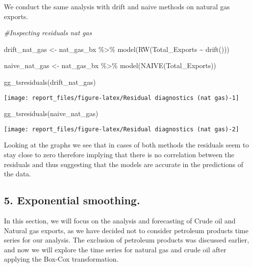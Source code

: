 \documentclass[
]{article}
\newenvironment{Shaded}{\begin{snugshade}}{\end{snugshade}}
\newcommand{\CommentTok}[1]{\textcolor[rgb]{0.56,0.35,0.01}{\textit{#1}}}
\newcommand{\FunctionTok}[1]{\textcolor[rgb]{0.00,0.00,0.00}{#1}}
\newcommand{\NormalTok}[1]{#1}
\newcommand{\OtherTok}[1]{\textcolor[rgb]{0.56,0.35,0.01}{#1}}
\newcommand{\SpecialCharTok}[1]{\textcolor[rgb]{0.00,0.00,0.00}{#1}}
\begin{document}
We conduct the same analysis with drift and naive methods on natural gas
exports.

\begin{Shaded}
\begin{Highlighting}[]
\CommentTok{\#Inspecting residuals nat gas}

\NormalTok{drift\_nat\_gas }\OtherTok{\textless{}{-}}\NormalTok{ nat\_gas\_bx }\SpecialCharTok{\%\textgreater{}\%} 
  \FunctionTok{model}\NormalTok{(}\FunctionTok{RW}\NormalTok{(Total\_Exports }\SpecialCharTok{\textasciitilde{}} \FunctionTok{drift}\NormalTok{()))}

\NormalTok{naive\_nat\_gas }\OtherTok{\textless{}{-}}\NormalTok{ nat\_gas\_bx }\SpecialCharTok{\%\textgreater{}\%} 
  \FunctionTok{model}\NormalTok{(}\FunctionTok{NAIVE}\NormalTok{(Total\_Exports))}

\FunctionTok{gg\_tsresiduals}\NormalTok{(drift\_nat\_gas)}
\end{Highlighting}
\end{Shaded}

\begin{center}\texttt{[image: report\_files/figure-latex/Residual diagnostics (nat gas)-1]} \end{center}

\begin{Shaded}
\begin{Highlighting}[]
\FunctionTok{gg\_tsresiduals}\NormalTok{(naive\_nat\_gas)}
\end{Highlighting}
\end{Shaded}

\begin{center}\texttt{[image: report\_files/figure-latex/Residual diagnostics (nat gas)-2]} \end{center}

Looking at the graphs we see that in cases of both methods the residuals
seem to stay close to zero therefore implying that there is no
correlation between the residuals and thus suggesting that the models
are accurate in the predictions of the data.

\hypertarget{exponential-smoothing.}{%
\subsection{5. Exponential smoothing.}\label{exponential-smoothing.}}

In this section, we will focus on the analysis and forecasting of Crude
oil and Natural gas exports, as we have decided not to consider
petroleum products time series for our analysis. The exclusion of
petroleum products was discussed earlier, and now we will explore the
time series for natural gas and crude oil after applying the Box-Cox
transformation.
\end{document}
